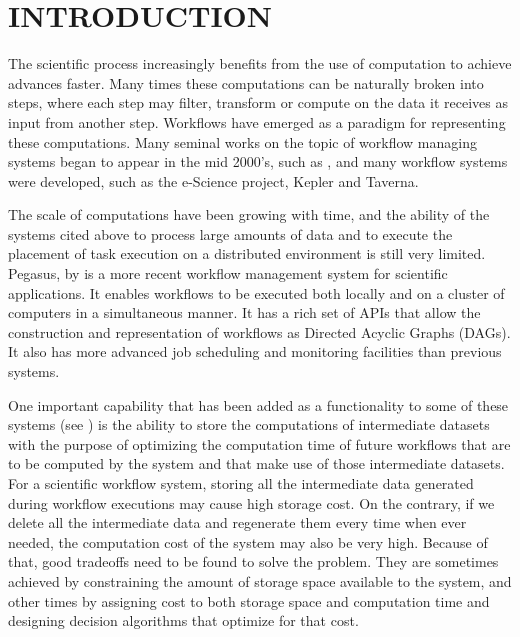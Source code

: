 \chapter{INTRODUCTION}
\label{chap:introduction}
The scientific process increasingly benefits from the use of computation to achieve advances faster. Many times these computations can be naturally broken into steps, where each step may filter, transform or compute on the data it receives as input from another step.  Workflows have emerged as a paradigm for representing these computations. Many seminal works on the topic of workflow managing systems began to appear in the mid 2000's, such as \cite{yu2005taxonomy, fox2006special, gil2007examining}, and many workflow systems were developed, such as the e-Science project\cite{deelman2009workflows}, Kepler\cite{altintas2004kepler} and Taverna\cite{oinn2006taverna}.  

The scale of computations have been growing with time, and the ability of the systems cited above to process large amounts of data and to execute the placement of task execution on a distributed environment is still very limited.  Pegasus, by \cite{singh2008workflow} is a more recent workflow management system for scientific applications.  It enables workflows to be executed both locally and on a cluster of computers in a simultaneous manner.  It has a rich set of APIs that allow the construction and representation of workflows as Directed Acyclic Graphs (DAGs).  It also has more advanced job scheduling and monitoring facilities than previous systems.  

One important capability that has been added as a functionality to some of these systems (see \cite{yuan2012data}) is the ability to store the computations of intermediate datasets with the purpose of optimizing the computation time of future workflows that are to be computed by the system and that make use of those intermediate datasets. For a scientific workflow system, storing all the intermediate data generated during workflow executions may cause high storage cost.  On the contrary, if we delete all the intermediate data and regenerate them every time when ever needed, the computation cost of the system may also be very high. Because of that, good tradeoffs need to be found to solve the problem.  They are sometimes achieved by constraining the amount of storage space available to the system, and other times by assigning cost to both storage space and computation time and designing decision algorithms that optimize for that cost. 

